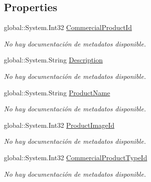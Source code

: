 \subsection*{Properties}
\begin{DoxyCompactItemize}
\item 
global\-::\-System.\-Int32 \hyperlink{class_game_memory_1_1_commercial_products_a30bdc23cb928a5a4ffcc46e5cfb6dcbf}{Commercial\-Product\-Id}
\begin{DoxyCompactList}\small\item\em No hay documentación de metadatos disponible. \end{DoxyCompactList}\item 
global\-::\-System.\-String \hyperlink{class_game_memory_1_1_commercial_products_ac2bea26ba487b163251d3cc2e30f69c6}{Description}
\begin{DoxyCompactList}\small\item\em No hay documentación de metadatos disponible. \end{DoxyCompactList}\item 
global\-::\-System.\-String \hyperlink{class_game_memory_1_1_commercial_products_a1ecd53e23a0d6730619c832d2baa96a6}{Product\-Name}
\begin{DoxyCompactList}\small\item\em No hay documentación de metadatos disponible. \end{DoxyCompactList}\item 
global\-::\-System.\-Int32 \hyperlink{class_game_memory_1_1_commercial_products_ab31ea73b3ff3ec456f255b1e215d9147}{Product\-Image\-Id}
\begin{DoxyCompactList}\small\item\em No hay documentación de metadatos disponible. \end{DoxyCompactList}\item 
global\-::\-System.\-Int32 \hyperlink{class_game_memory_1_1_commercial_products_a0bc077baf7304a4621d25f0d64890148}{Commercial\-Product\-Type\-Id}
\begin{DoxyCompactList}\small\item\em No hay documentación de metadatos disponible. \end{DoxyCompactList}\item 

\end{DoxyCompactItemize}
